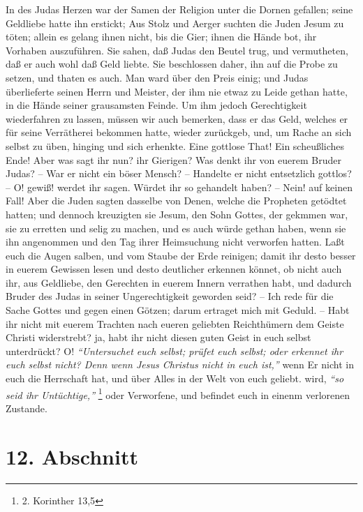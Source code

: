 In des Judas Herzen war der Samen der Religion unter die Dornen gefallen; seine
Geldliebe hatte ihn erstickt; Aus Stolz und Aerger suchten die Juden Jesum zu
töten; allein es gelang ihnen nicht, bis die Gier; ihnen die Hände bot, ihr
Vorhaben auszuführen. Sie sahen, daß Judas den Beutel trug, und vermutheten, daß
er auch wohl daß Geld liebte. Sie beschlossen daher, ihn auf die Probe zu
setzen, und thaten es auch. Man ward über den Preis einig; und Judas
überlieferte seinen Herrn und Meister, der ihm nie etwaz zu Leide gethan hatte,
in die Hände seiner grausamsten Feinde. Um ihm jedoch Gerechtigkeit wiederfahren
zu lassen, müssen wir auch bemerken, dass er das Geld, welches er für seine
Verrätherei bekommen hatte, wieder zurückgeb, und, um Rache an sich selbst zu
üben, hinging und sich erhenkte. Eine gottlose
That! Ein scheußliches Ende! Aber
was sagt ihr nun? ihr Gierigen? Was denkt ihr von euerem Bruder Judas? -- War er
nicht ein böser Mensch? -- Handelte er nicht entsetzlich gottlos? -- O! gewiß!
werdet ihr sagen. Würdet ihr so gehandelt haben? -- Nein! auf keinen Fall! Aber
die Juden sagten dasselbe von Denen, welche die
Propheten getödtet hatten; und
dennoch kreuzigten sie Jesum, den Sohn Gottes, der gekmmen war, sie zu
erretten
und selig zu machen, und es auch würde gethan haben, wenn sie ihn angenommen und
den Tag ihrer Heimsuchung nicht verworfen hatten. Laßt euch
die Augen salben,
und vom Staube der Erde reinigen; damit ihr desto besser in euerem Gewissen
lesen und desto deutlicher erkennen könnet, ob nicht auch ihr, aus Geldliebe,
den Gerechten in euerem Innern verrathen habt, und dadurch Bruder des Judas in
seiner Ungerechtigkeit geworden seid? -- Ich rede für die Sache Gottes und gegen
einen Götzen; darum ertraget mich mit Geduld. -- Habt ihr nicht
mit euerem
Trachten nach eueren geliebten Reichthümern dem Geiste Christi widerstrebt? ja,
habt ihr nicht diesen guten Geist in euch selbst unterdrückt? O!
\textit{"`Untersuchet
euch selbst; prüfet euch selbst; oder erkennet ihr euch selbst nicht? Denn wenn
Jesus Christus nicht in euch ist,"'}
wenn Er nicht in euch die Herrschaft hat,
und über Alles in der Welt von euch geliebt. wird, \textit{"`so seid ihr
Untüchtige,"'}
\footnote{2. Korinther 13,5}
oder Verworfene, und befindet euch in einenm
verlorenen Zustande.

\section{12. Abschnitt} \label{kap13_ab12}

